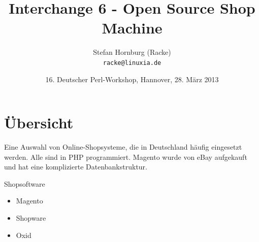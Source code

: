 \usepackage[utf8]{inputenc}
\usepackage[T1]{fontenc}
\usepackage{mathptmx}
\usepackage[scaled=.90]{helvet}
\usepackage{courier}
\usepackage{caption}
\captionsetup{labelformat=empty,labelsep=none}
\usepackage{verbatim}
\usepackage{hyperref}
\usepackage{listings}
\lstset{language=Perl,basicstyle=\normalsize,tabsize=3,showstringspaces=false}

\title{Interchange 6 - Open Source Shop Machine}
\author[racke]{Stefan Hornburg (Racke)\\ \texttt{racke@linuxia.de}}
\date{16. Deutscher Perl-Workshop, Hannover, 28. März 2013}


\maketitle{}

\begin{frame}
  \titlepage
\end{frame}

\tableofcontents

\section{Übersicht}

Eine Auswahl von Online-Shopsysteme, die in Deutschland häufig eingesetzt
werden. Alle sind in PHP programmiert. Magento wurde von eBay aufgekauft
und hat eine komplizierte Datenbankstruktur.
 
\begin{frame}{Shopsoftware}
  \begin{itemize}
  \item Magento
  \item Shopware
  \item Oxid
  \end{itemize}
\end{frame}

